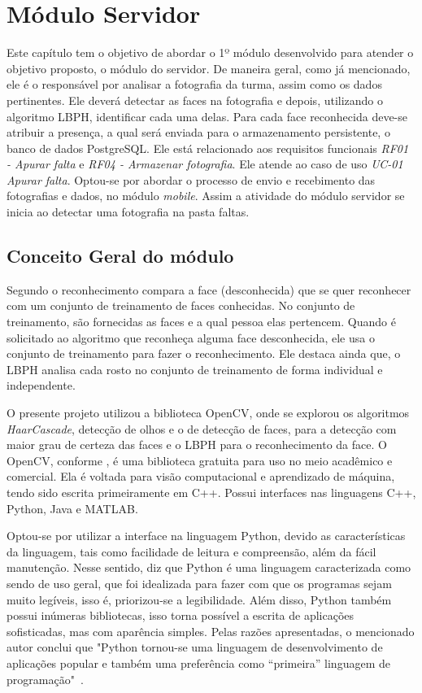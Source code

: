 \chapter{Módulo Servidor}
\noindent
Este capítulo tem o objetivo de abordar o 1º módulo desenvolvido para atender o objetivo proposto, o módulo do servidor. De maneira geral, como já mencionado, ele é o responsável por analisar a fotografia da turma, assim como os dados pertinentes. Ele deverá detectar as faces na fotografia e depois, utilizando o algoritmo LBPH, identificar cada uma delas. Para cada face reconhecida deve-se atribuir a presença, a qual será enviada para o armazenamento persistente, o banco de dados PostgreSQL. Ele está relacionado aos requisitos funcionais \textit{RF01 - Apurar falta} e   \textit{RF04 - Armazenar fotografia}. Ele atende ao caso de uso \textit{UC-01 Apurar falta}. Optou-se por abordar o processo de envio e recebimento das fotografias e dados, no módulo \textit{mobile}. Assim a atividade do módulo servidor se inicia ao detectar uma fotografia na pasta faltas.  

\section{Conceito Geral do módulo}
\noindent
 Segundo \citep{Arubas} o reconhecimento compara a face (desconhecida) que se quer reconhecer com um conjunto de treinamento de faces conhecidas. No conjunto de treinamento, são fornecidas as faces e a qual pessoa elas pertencem. Quando é solicitado ao algoritmo que reconheça alguma face desconhecida, ele usa o conjunto de treinamento para fazer o reconhecimento. Ele destaca ainda que, o LBPH analisa cada rosto no conjunto de treinamento de forma individual e independente. 
 
O presente projeto utilizou a biblioteca OpenCV, onde se explorou os algoritmos \textit{HaarCascade}, detecção de olhos e o de detecção de faces, para a detecção com maior grau de certeza das faces e o LBPH para o reconhecimento da face. O OpenCV, conforme \citep{opengeral2018}, é uma biblioteca gratuita para uso no meio acadêmico e comercial. Ela é voltada para visão computacional e aprendizado de máquina, tendo sido escrita primeiramente em C++. Possui interfaces nas linguagens C++, Python, Java e MATLAB.

Optou-se por utilizar a interface na linguagem Python, devido as características da linguagem, tais como facilidade de leitura e compreensão, além da fácil manutenção. Nesse sentido, \citep{pythonLTC} diz que Python é uma linguagem caracterizada como sendo de uso geral, que foi idealizada para fazer com que os programas sejam muito legíveis, isso é, priorizou-se a legibilidade. Além disso, Python também possui inúmeras  bibliotecas,  isso torna possível a escrita de aplicações sofisticadas, mas com aparência simples. Pelas razões apresentadas, o mencionado autor conclui que "Python tornou-se uma linguagem de desenvolvimento de aplicações popular e também uma preferência como “primeira” linguagem de programação"\ \cite[p. 22]{pythonLTC}. 

